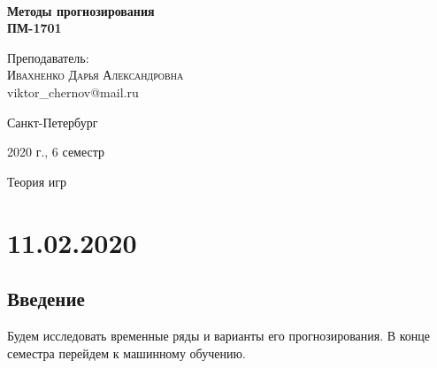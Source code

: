 \documentclass[aps,%
12pt,%
final,%
oneside,
onecolumn,%
musixtex, %
superscriptaddress,%
centertags]{article} %
\begin{document}
\begin{titlepage} 
\begin{center}
 
\textbf{}\\[10.0cm]
\textbf{\LARGE Методы прогнозирования}\\[0.5cm]
\textbf{\Large ПМ-1701} \\[0.1cm]

\begin{center} \large
{Преподаватель:} \\[0.5cm]
\textsc {Ивахненко Дарья Александровна}\\
{viktor\_chernov@mail.ru}\\
\end{center}
\vfill 

{\large {Санкт-Петербург}} \par
{\large {2020 г., 6 семестр}}
\end{center} 
\end{titlepage}

\begin{thebibliography}{3}
Теория игр
\end{thebibliography}
\tableofcontents
\newpage

\section{11.02.2020}
\subsection{Введение}
Будем исследовать временные ряды и варианты его прогнозирования. В конце семестра перейдем к машинному обучению.
\end{document}
